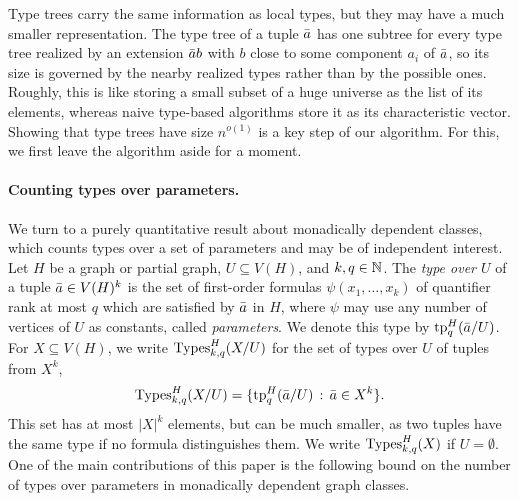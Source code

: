 \begin{center}
  \caption{\emph{Left:} A partial graph with $7$ vertices and colors $X,Y,Z$. \emph{Right:} $\tree_q(a)$ for $q=1$ and $r_1=1$, drawn as a tree of depth $q$ whose nodes are the sets $\atp(a)$ and $\atp(a\,v)$. The edge label $1$ records that $v$ is close to the first entry of the tuple $(a)$. The lists of vertex labels below the boxes show which vertices of $\Ball_{r_1}(a)$ give each child of the root node. The vertex $g$ outside the locality radius \(r_1 = 1\) does not occur in the tree. Note that the size of the tree adapts to the number of atomic types $\atp(a\,v)$ realized in the ball.}
  \label{fig:ov-type-tree}
\end{center}

Type trees carry the same information as local types, but they may have a much smaller representation.
The type tree of a tuple $\bar a$ has one subtree for every type tree realized by an extension $\bar a b$ with $b$ close to some component $a_i$ of $\bar a$, so its size is governed by the nearby realized types rather than by the possible ones.
Roughly, this is like storing a small subset of a huge universe as the list of its elements, whereas naive type-based algorithms store it as its characteristic vector.
Showing that type trees have size $n^{o(1)}$ is a key step of our algorithm.
For this, we first leave the algorithm aside for a moment.


\paragraph{Counting types over parameters.}
We turn to a purely quantitative result about monadically dependent classes, which counts types over a set of parameters and may be of independent interest.
Let $H$ be a graph or partial graph, $U\subseteq V(H)$, and $k,q\in\mathbb N$.
The \emph{type over $U$} of a tuple $\bar a\in V(H)^k$ is the set of first-order formulas $\psi(x_1,\ldots,x_k)$ of quantifier rank at most $q$ which are satisfied by $\bar a$ in $H$,
where $\psi$ may use any number of vertices of $U$ as constants, called \emph{parameters}. We denote this type by $\textnormal{tp}^H_q(\bar a/U)$.
For $X\subseteq V(H)$, we write $\operatorname{Types}^H_{k,q}(X/U)$ for the set of types over $U$ of tuples from $X^k$,
$$\operatorname{Types}^H_{k,q}(X/U)=\{\textnormal{tp}^H_q(\bar a/U) \,:\, \bar a\in X^k \}.$$
This set has at most $|X|^k$ elements, but can be much smaller, as two tuples  have the same type if no formula distinguishes them.
We write $\operatorname{Types}^H_{k,q}(X)$ if $U=\emptyset$.
One of the main contributions of this paper is the following bound on the number of types over parameters in monadically dependent graph classes.

